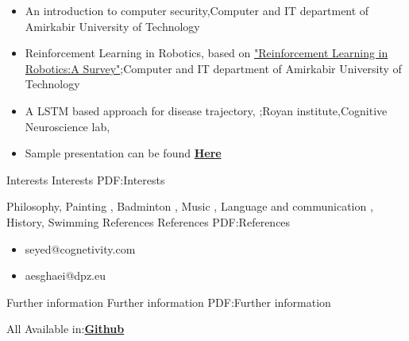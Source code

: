 \documentclass[letterpaper,MMMyyyy,nonstopmode]{simpleresumecv}
\begin{document}
\begin{Body}
\Entry
\begin{itemize}
\item An introduction to computer security,Computer and IT department of Amirkabir University of Technology
  \hfill
{}

\item Reinforcement Learning in Robotics, based on \href{https://ri.cmu.edu/pub_files/2013/7/Kober_IJRR_2013.pdf} {"Reinforcement Learning in Robotics:A Survey"};Computer and IT department of Amirkabir University of Technology
  \hfill
{}

\item A LSTM based approach for disease trajectory, ;Royan institute,Cognitive Neuroscience lab,
  \hfill
{}

\item Sample presentation can be found  \href{https://github.com/Yasaman1997/Presentation/blob/master/bandicam%202020-08-01%2011-49-26-553.mp4} {\textbf{Here}}

\end{itemize}


\Section
{Interests}
{Interests}
{PDF:Interests}

\Entry
Philosophy,
Painting ,
Badminton ,
Music ,  
Language  and communication ,
History,
Swimming
\Section
{References}
{References}
{PDF:References}

\Entry
\begin{itemize}
\item seyed@cognetivity.com 
\item aesghaei@dpz.eu

\end{itemize}


\Section
{Further information}
{Further information}
{PDF:Further information}

\Entry
All Available in:\href{https://github.com/Yasaman1997} {\textbf{Github}}  














\end{Body}

\end{document}
